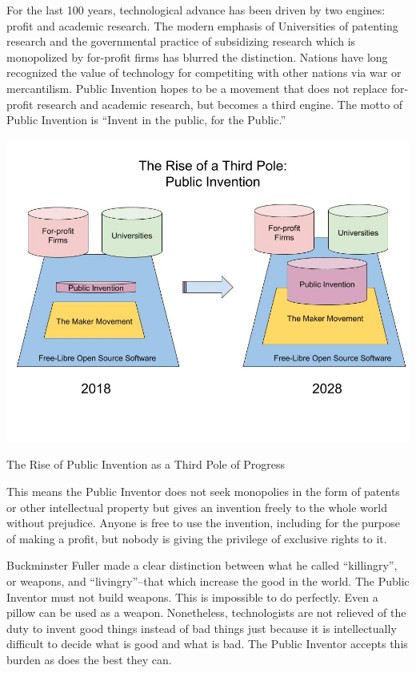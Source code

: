 \documentclass[
	fontsize=10pt, %
	twoside=false, %
	secnumdepth=1, %
]{kaobook}
\begin{document}
For the last 100 years, technological advance has been driven
by two engines: profit and academic research.
The modern emphasis of Universities of patenting research
and the governmental practice of subsidizing research which
is monopolized by for-profit firms has blurred the distinction.
Nations have long recognized the value of technology for
competiting with other nations via
war or mercantilism. Public Invention hopes to be a movement
that does not replace for-profit research and academic research,
but becomes a third engine. The motto of Public Invention
is ``Invent in the public, for the Public.''

\begin{marginfigure}[-5.5cm]
    \includegraphics{figures/The_Rise_of_Public_Invention.jpg}
  \caption{The Rise of Public Invention as a Third Pole of Progress}
\end{marginfigure}

This means the Public Inventor does not seek monopolies in
the form of patents or other intellectual property but
gives an invention freely to the whole world without prejudice.
Anyone is free to use the invention, including for the purpose
of making a profit, but nobody is giving the privilege of
exclusive rights to it.

Buckminster Fuller made a clear distinction between what he
called ``killingry'', or weapons, and ``livingry''--that
which increase the good in the world. The Public Inventor
must not build weapons. This is impossible
to do perfectly.
Even a pillow can be used as a weapon. Nonetheless,
technologists are not relieved of the duty to invent
good things instead of bad things just because it is
intellectually difficult to decide what is good and what is bad.
The Public Inventor accepts this burden as does the best they can.
\end{document}
